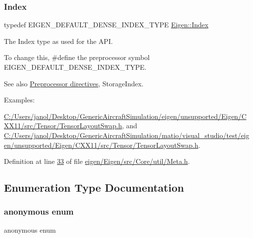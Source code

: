 \subsubsection{\texorpdfstring{Index}{Index}}
{\footnotesize\ttfamily typedef E\+I\+G\+E\+N\+\_\+\+D\+E\+F\+A\+U\+L\+T\+\_\+\+D\+E\+N\+S\+E\+\_\+\+I\+N\+D\+E\+X\+\_\+\+T\+Y\+PE \hyperlink{namespace_eigen_a62e77e0933482dafde8fe197d9a2cfde}{Eigen\+::\+Index}}



The Index type as used for the A\+PI. 

To change this, {\ttfamily \#define} the preprocessor symbol {\ttfamily E\+I\+G\+E\+N\+\_\+\+D\+E\+F\+A\+U\+L\+T\+\_\+\+D\+E\+N\+S\+E\+\_\+\+I\+N\+D\+E\+X\+\_\+\+T\+Y\+PE}. \begin{DoxySeeAlso}{See also}
\hyperlink{TopicPreprocessorDirectives}{Preprocessor directives}, Storage\+Index. 
\end{DoxySeeAlso}
\begin{Desc}
\item[Examples\+: ]\par
\hyperlink{_c_1_2_users_2janol_2_desktop_2_generic_aircraft_simulation_2eigen_2unsupported_2_eigen_2_c_x_x1995ff76eaccdd7a9ea13b307626fb9df}{C\+:/\+Users/janol/\+Desktop/\+Generic\+Aircraft\+Simulation/eigen/unsupported/\+Eigen/\+C\+X\+X11/src/\+Tensor/\+Tensor\+Layout\+Swap.\+h}, and \hyperlink{_c_1_2_users_2janol_2_desktop_2_generic_aircraft_simulation_2matio_2visual_studio_2test_2eigen_2286551beec45c5254494adb391cdc80f}{C\+:/\+Users/janol/\+Desktop/\+Generic\+Aircraft\+Simulation/matio/visual\+\_\+studio/test/eigen/unsupported/\+Eigen/\+C\+X\+X11/src/\+Tensor/\+Tensor\+Layout\+Swap.\+h}.\end{Desc}


Definition at line \hyperlink{eigen_2_eigen_2src_2_core_2util_2_meta_8h_source_l00033}{33} of file \hyperlink{eigen_2_eigen_2src_2_core_2util_2_meta_8h_source}{eigen/\+Eigen/src/\+Core/util/\+Meta.\+h}.



\subsection{Enumeration Type Documentation}
\mbox{\label{namespace_eigen_a668ffb0fb66c55c1c98bd35c52df648e}} 
\subsubsection{\texorpdfstring{anonymous enum}{anonymous enum}}
{\footnotesize\ttfamily anonymous enum}

